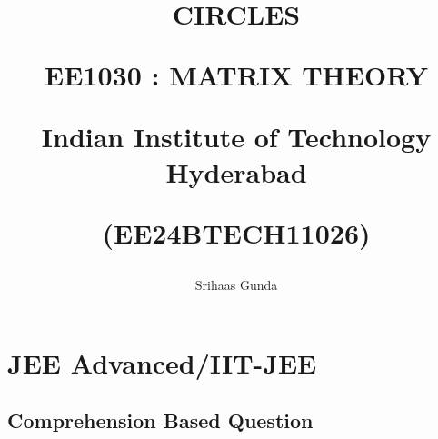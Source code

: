 \documentclass[journal,12pt,twocolumn]{IEEEtran}
\theoremstyle{remark}
\begin{document}
%






\title{
CIRCLES

\large{EE1030 : MATRIX THEORY}

Indian Institute of Technology Hyderabad

\author{Srihaas Gunda}

(EE24BTECH11026)
}





\maketitle

\newpage



\bigskip

\renewcommand{\thefigure}{\theenumi}
\renewcommand{\thetable}{\theenumi}

\section{JEE Advanced/IIT-JEE}
\subsection{Comprehension Based Question}
\end{document}
